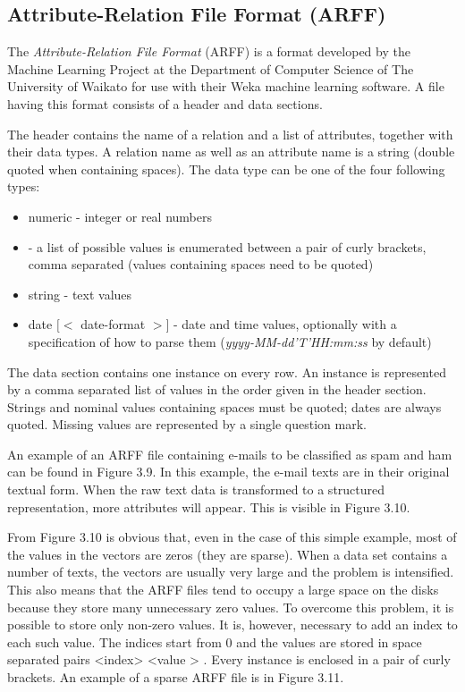 \documentclass[11pt,openany,executivepaper]{book}
\begin{document}
\subsection{Attribute-Relation File Format (ARFF)}
The \textit{Attribute-Relation File Format} (ARFF) is a format developed by the Machine Learning Project at the Department of Computer Science of The University of Waikato for use with their Weka machine learning software. A file having this format consists of a header and data sections.

The header contains the name of a relation and a list of attributes, together with their data types. A relation name as well as an attribute name is a string (double quoted when containing spaces). The data type can be one of the four following types:


\begin{itemize}
  \item numeric - integer or real numbers
  \item <nominal-specification> - a list of possible values is enumerated between a pair of curly brackets, comma separated (values containing spaces need to be quoted)
  \item string - text values
  \item date $[<$ date-format $>]$ - date and time values, optionally with a specification of how to parse them (\textit{yyyy-MM-dd'T'HH:mm:ss} by default)
\end{itemize}

The data section contains one instance on every row. An instance is represented by a comma separated list of values in the order given in the header section. Strings and nominal values containing spaces must be quoted; dates are always quoted. Missing values are represented by a single question mark.

An example of an ARFF file containing e-mails to be classified as spam and ham can be found in Figure 3.9. In this example, the e-mail texts are in their original textual form. When the raw text data is transformed to a structured representation, more attributes will appear. This is visible in Figure 3.10.

From Figure 3.10 is obvious that, even in the case of this simple example, most of the values in the vectors are zeros (they are sparse). When a data set contains a number of texts, the vectors are usually very large and the problem is intensified. This also means that the ARFF files tend to occupy a large space on the disks because they store many unnecessary zero values. To overcome this problem, it is possible to store only non-zero values. It is, however, necessary to add an index to each such value. The indices start from 0 and the values are stored in space separated pairs <index> <value > . Every instance is enclosed in a pair of curly brackets. An example of a sparse ARFF file is in Figure 3.11.
\end{document}
